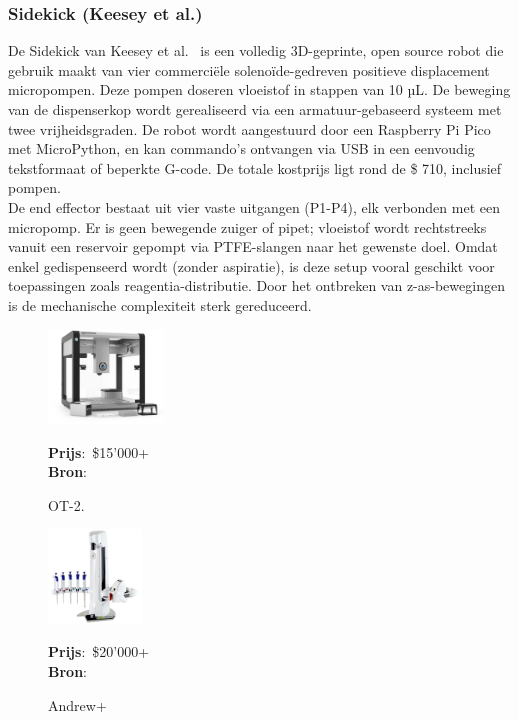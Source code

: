 \subsubsection{Sidekick (Keesey et al.)} 
De Sidekick van Keesey et al.\ \cite{RN41} is een volledig 3D-geprinte, open source robot die gebruik maakt van vier commerciële solenoïde-gedreven positieve displacement micropompen. Deze pompen doseren vloeistof in stappen van 10 µL. De beweging van de dispenserkop wordt gerealiseerd via een armatuur-gebaseerd systeem met twee vrijheidsgraden. De robot wordt aangestuurd door een Raspberry Pi Pico met MicroPython, en kan commando’s ontvangen via USB in een eenvoudig tekstformaat of beperkte G-code. De totale kostprijs ligt rond de \$ 710, inclusief pompen.
\\[12pt]De end effector bestaat uit vier vaste uitgangen (P1-P4), elk verbonden met een micropomp. Er is geen bewegende zuiger of pipet; vloeistof wordt rechtstreeks vanuit een reservoir gepompt via PTFE-slangen naar het gewenste doel. Omdat enkel gedispenseerd wordt (zonder aspiratie), is deze setup vooral geschikt voor toepassingen zoals reagentia-distributie. Door het ontbreken van z-as-bewegingen is de mechanische complexiteit sterk gereduceerd.
\\[12pt]\begin{minipage}[t]{0.249\textwidth}
    \vspace{0pt}
    \begin{figure}[H]
        \centering
        \captionsetup{width=0.85\textwidth} %
        \includegraphics[height=2.5cm]{figures/opentronsot2.png}
        \caption{OT-2.}\label{fig:OT2}
        \textbf{Prijs}:\ \$15'000+\\
        \textbf{Bron}:\ \cite{RN27}
    \end{figure}
\end{minipage}
\begin{minipage}[t]{0.249\textwidth}
    \vspace{0pt}
    \begin{figure}[H]
        \centering
        \captionsetup{width=0.85\textwidth} %
        \includegraphics[height=2.5cm]{figures/Andrew-Alliance-liquid-handling-robot-1024x1024.png}
        \caption{Andrew+}\label{fig:Andrew}
        \textbf{Prijs}:\ \$20'000+\ \cite{RN43}\\
        \textbf{Bron}:\ \cite{RN28}
    \end{figure}
\end{minipage}
